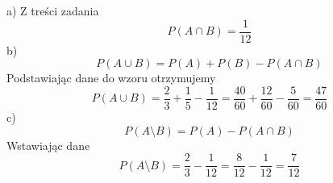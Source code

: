 \medskip
{} 
\medskip

a) Z treści zadania 
$$P({A}\cap{B})=\frac{1}{12}$$
b)$$P({A}\cup{B})=P(A)+P(B)-P({A}\cap{B})$$
Podstawiając dane do wzoru otrzymujemy
$$P({A}\cup{B})=\frac{2}{3}+\frac{1}{5}-\frac{1}{12}=\frac{40}{60}+\frac{12}{60}-\frac{5}{60}=\frac{47}{60}$$
c)$$P({A}\setminus{B})=P(A)-P({A}\cap{B})$$
Wstawiając dane
$$P({A}\setminus{B})=\frac{2}{3}-\frac{1}{12}=\frac{8}{12}-\frac{1}{12}=\frac{7}{12}$$



